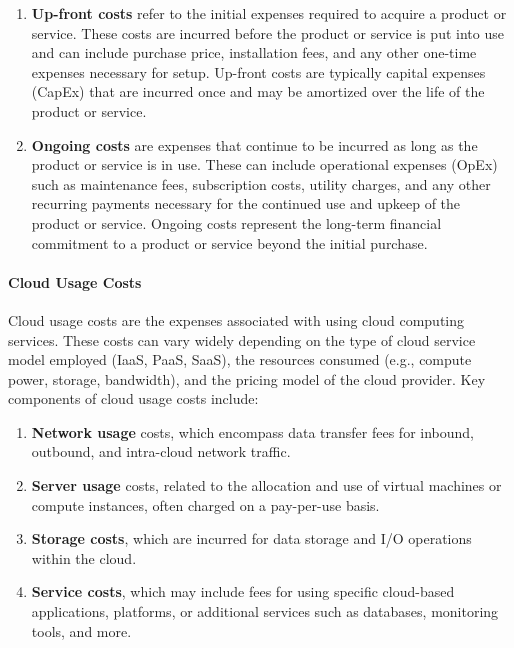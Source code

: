 \documentclass[10pt, landscape]{article}
\begin{document}
\begin{multicols*}{4}
\begin{enumerate}
\def\labelenumi{\arabic{enumi}.}
\item
  \textbf{Up-front costs} refer to the initial expenses required to
  acquire a product or service. These costs are incurred before the
  product or service is put into use and can include purchase price,
  installation fees, and any other one-time expenses necessary for
  setup. Up-front costs are typically capital expenses (CapEx) that are
  incurred once and may be amortized over the life of the product or
  service.
\item
  \textbf{Ongoing costs} are expenses that continue to be incurred as
  long as the product or service is in use. These can include
  operational expenses (OpEx) such as maintenance fees, subscription
  costs, utility charges, and any other recurring payments necessary for
  the continued use and upkeep of the product or service. Ongoing costs
  represent the long-term financial commitment to a product or service
  beyond the initial purchase.
\end{enumerate}

\paragraph{Cloud Usage Costs}\label{cloud-usage-costs}

Cloud usage costs are the expenses associated with using cloud computing
services. These costs can vary widely depending on the type of cloud
service model employed (IaaS, PaaS, SaaS), the resources consumed (e.g.,
compute power, storage, bandwidth), and the pricing model of the cloud
provider. Key components of cloud usage costs include:

\begin{enumerate}
\def\labelenumi{\arabic{enumi}.}
\tightlist
\item
  \textbf{Network usage} costs, which encompass data transfer fees for
  inbound, outbound, and intra-cloud network traffic.
\item
  \textbf{Server usage} costs, related to the allocation and use of
  virtual machines or compute instances, often charged on a pay-per-use
  basis.
\item
  \textbf{Storage costs}, which are incurred for data storage and I/O
  operations within the cloud.
\item
  \textbf{Service costs}, which may include fees for using specific
  cloud-based applications, platforms, or additional services such as
  databases, monitoring tools, and more.
\end{enumerate}


\end{multicols*}
\end{document}
